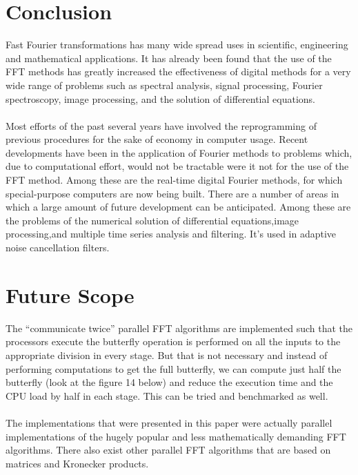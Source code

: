 \documentclass[preprint,12pt]{elsarticle}
\begin{document}
\section{Conclusion}
Fast Fourier transformations has many wide spread uses in scientific, engineering and mathematical applications. It has already been found that the use of the FFT methods has greatly increased the effectiveness of digital methods for a very wide range of problems such as spectral analysis, signal processing, Fourier spectroscopy, image processing, and the solution of differential equations.\\\\
Most efforts of the past several years have involved the reprogramming of previous procedures for the sake of economy in computer usage. Recent developments have been in the application of Fourier methods to problems which, due to computational effort, would not be tractable were it not for the use of the FFT method. Among these are the real-time digital Fourier methods, for which special-purpose computers are now being built. There are a number of areas in which a large amount of future development can be anticipated. Among these are the problems of the numerical solution of differential equations,image processing,and multiple time series analysis and filtering. It's used in adaptive noise cancellation filters.

\section{Future Scope}
The “communicate twice” parallel FFT algorithms are implemented such that the processors execute the butterfly operation is performed on all the inputs to the appropriate division in every stage. But that is not necessary and instead of performing computations to get the full butterfly, we can compute just half the butterfly (look at the figure 14 below) and reduce the execution time and the CPU load by half in each stage. This can be tried and benchmarked as well. \\\\The implementations that were presented in this paper were actually parallel implementations of the hugely popular and less mathematically demanding FFT algorithms. There also exist other parallel FFT algorithms that are based on matrices and Kronecker products. 

\end{document}
